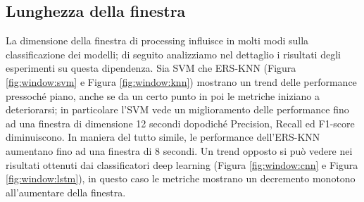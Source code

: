 \subsection{Lunghezza della finestra}
\label{ssec:lunghezza-della-finestra}

La dimensione della finestra di processing influisce in molti modi sulla classificazione dei modelli; di seguito analizziamo nel dettaglio i risultati degli esperimenti su questa dipendenza. Sia SVM che ERS-KNN (Figura \ref{fig:window:svm} e Figura \ref{fig:window:knn}) mostrano un trend delle performance pressoché piano, anche se da un certo punto in poi le metriche iniziano a deteriorarsi; in particolare l'SVM vede un miglioramento delle performance fino ad una finestra di dimensione 12 secondi dopodiché Precision, Recall ed F1-score diminuiscono. In maniera del tutto simile, le performance dell'ERS-KNN aumentano fino ad una finestra di 8 secondi. Un trend opposto si può vedere nei risultati ottenuti dai classificatori deep learning (Figura \ref{fig:window:cnn} e Figura \ref{fig:window:lstm}), in questo caso le metriche mostrano un decremento monotono all'aumentare della finestra.

